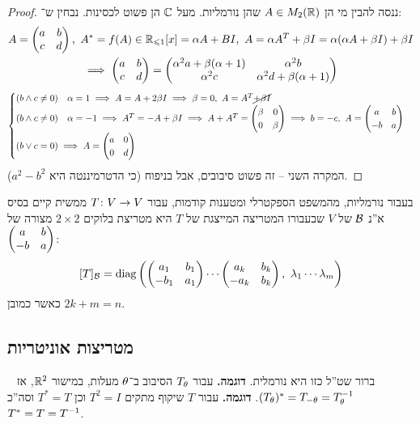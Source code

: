 \documentclass[name=רשימות אלגברה לינארית 2א]{../../../tex/classes/megasumPreamble}
\begin{document}
	\begin{proof}
		ננסה להבין מי הן $A \in M_2(\mathbb{R})$ שהן נורמליות. מעל $\mathbb{C}$ הן פשוט לכסינות. נבחין ש־: 
		\begin{gather}
			A = \begin{pmatrix} a & b \\ c & d \end{pmatrix}, \ A^* = f(A) \in \mathbb{R}_{\leqslant1}[x] = \alpha A + BI, \ A = \alpha A^T + \beta I = \alpha(\alpha A + \beta I) + \beta I \\
			\implies \begin{pmatrix} a & b \\ c & d \end{pmatrix} = \begin{pmatrix} \alpha^2 a + \beta(\alpha + 1) & \alpha^2 b \\ \alpha^2 c & \alpha^2 d + \beta (\alpha + 1) \end{pmatrix}
		\end{gather}
		\begin{align*}
			\begin{cases}
				(b \land c \neq 0 ) \quad \alpha = 1 \implies  A = A + 2 \beta I \implies \beta = 0, \ A = A^T \cancel{+ \beta I} \\
				(b \land c \neq 0) \quad \alpha = -1 \implies A^T = - A  +\beta I  \implies A + A^T = \begin{pmatrix} \beta & 0 \\ 0 & \beta \end{pmatrix} \implies b = -c, \ A = \begin{pmatrix} a & b \\ -b & a \end{pmatrix} \\
				(b \lor c = 0) \implies A = \begin{pmatrix} a & 0 \\ 0 & d \end{pmatrix}
			\end{cases}
		\end{align*}
		המקרה השני – זה פשוט סיבובים, אבל בניפוח (כי הדטרמיננטה היא $a^2 - b^2$). 
	\end{proof}
	
	
	בעבור נורמליות, מהמשפט הספקטרלי ומטענות קודמות, עבור $T \colon V \to V$ ממשית קיים בסיס א''נ $\mathcal{B}$ של $V$ שבעבורו המטריצה המייצגת של $T$ היא מטריצת בלוקים $2 \times 2$ מצורה של $\begin{pmatrix} a & b \\ -b & a \end{pmatrix}$: 
	\[ [T]_{\mathcal{B}} = \operatorname{diag}\left ( \begin{pmatrix} a_1 & b_1 \\ -b_1 & a_1 \end{pmatrix} \cdots \begin{pmatrix} a_k & b_k \\ -a_k & b_k \end{pmatrix}, \ \lambda_1 \cdots \lambda_m \right ) \]
	כאשר כמובן $2k + m = n$. 
	
	
	
	\subsection{מטריצות אוניטריות}\ 
	ברור שט''ל כזו היא נורמלית. 
	\textbf{דוגמה. }עבור $T_\theta$ הסיבוב ב־$\theta$ מעלות, במישור $\mathbb{R}^2$, אז $(T_\theta)^* = T_{-\theta} = T^{-1}_{\theta}$.  
	\textbf{דוגמה. }עבור $T$ שיקוף מתקים $T^2 = I$ וכן $T^* = T$ וסה''כ $T^* = T = T^{-1}$. 
\end{document}
